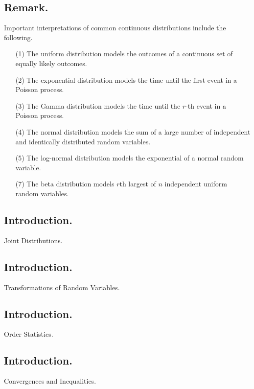 \documentclass[titlepage]{article}
\begin{document}
\subsection{Remark.} Important interpretations of common continuous distributions include the following.
\begin{enumerate}
\item[(1)] The uniform distribution models the outcomes of a continuous set of equally likely outcomes.
\item[(2)] The exponential distribution models the time until the first event in a Poisson process.
\item[(3)] The Gamma distribution models the time until the $r$-th event in a Poisson process.
\item[(4)] The normal distribution models the sum of a large number of independent and identically distributed random variables.
\item[(5)] The log-normal distribution models the exponential of a normal random variable.
\item[(7)] The beta distribution models $r$th largest of $n$ independent uniform random variables.
\end{enumerate}

\newpage {}

\subsection{Introduction.} Joint Distributions.

\newpage {}

\subsection{Introduction.} Transformations of Random Variables.

\newpage {}

\subsection{Introduction.} Order Statistics.

\newpage {}

\subsection{Introduction.} Convergences and Inequalities.
\end{document}

